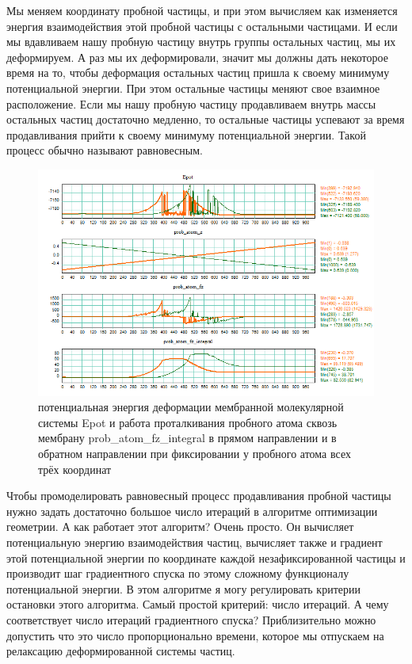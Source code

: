 \documentclass[12pt]{article}
\begin{document}
Мы меняем координату пробной частицы, и при этом вычисляем как изменяется энергия взаимодействия этой пробной частицы с остальными частицами. И если мы вдавливаем нашу пробную частицу внутрь группы остальных частиц, мы их деформируем. А раз мы их деформировали, значит мы должны дать некоторое время на то, чтобы деформация остальных частиц пришла к своему минимуму потенциальной энергии. При этом остальные частицы меняют свое взаимное расположение. Если мы нашу пробную частицу продавливаем внутрь массы остальных частиц достаточно медленно, то остальные частицы успевают за время продавливания прийти к своему минимуму потенциальной энергии. Такой процесс обычно называют равновесным.

%

\begin{figure}
    \centering
    \includegraphics[scale=0.5]{./molecules/nanotrubki/12_0/work_6H_CN_He/4_plots_1001_nstep=500_fix_xyz.png}
    \caption{потенциальная энергия деформации мембранной молекулярной системы Epot и работа проталкивания пробного атома сквозь мембрану prob\_atom\_fz\_integral в прямом направлении и в обратном направлении при фиксировании у пробного атома всех трёх координат}
    \label{fig:frame_center}
\end{figure}

Чтобы промоделировать равновесный процесс продавливания пробной частицы нужно задать достаточно большое число итераций в алгоритме оптимизации геометрии. А как работает этот алгоритм? Очень просто. Он вычисляет потенциальную энергию взаимодействия частиц, вычисляет также и градиент этой потенциальной энергии по координате каждой незафиксированной частицы и производит шаг градиентного спуска по этому сложному функционалу потенциальной энергии. В этом алгоритме я могу регулировать критерии остановки этого алгоритма. Самый простой критерий: число итераций. А чему соответствует число итераций градиентного спуска? Приблизительно можно допустить что это число пропорционально времени, которое мы отпускаем на релаксацию деформированной системы частиц.
\end{document}
